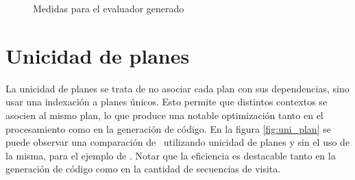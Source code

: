 \begin{figure}[h!]
    \begin{center}

    \end{center}
    \caption{\label{fug:med_eval_gen}Medidas para el evaluador generado}
    
\end{figure}

\section{Unicidad de planes}
La unicidad de planes se trata de no asociar cada plan con sus dependencias, sino usar una indexación a planes únicos. Esto permite que distintos contextos se asocien al mismo plan, lo que produce una notable optimización tanto en el procesamiento como en la generación de código. En la figura \ref{fig:uni_plan} se puede observar una comparación de \maggen\ utilizando unicidad de planes y sin el uso de la misma, para el ejemplo de . Notar que la eficiencia es destacable tanto en la generación de código como en la cantidad de secuencias de visita.

